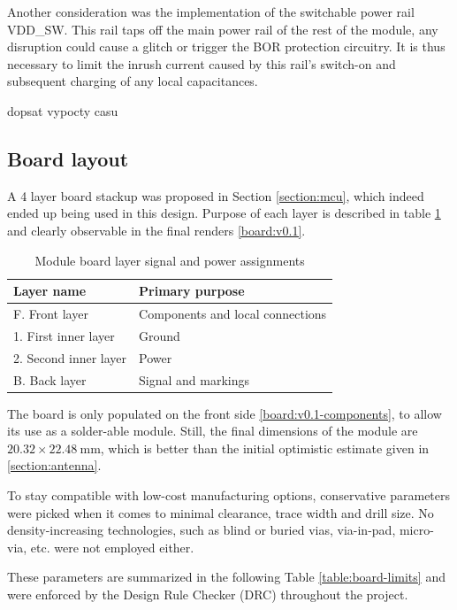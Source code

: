 Another consideration was the implementation of the switchable power rail VDD\_SW. This rail taps off the main power rail of the rest of the module, any disruption could cause a glitch or trigger the BOR protection circuitry. It is thus necessary to limit the inrush current caused by this rail's switch-on and subsequent charging of any local capacitances.

dopsat vypocty casu

\subsection{Board layout}
A 4 layer board stackup was proposed in Section \ref{section:mcu}, which indeed ended up being used in this design. Purpose of each layer is described in table \ref{table:board-layers} and clearly observable in the final renders \ref{board:v0.1}.

\begin{table}[H]
\begin{center}
\caption{\label{table:board-layers}Module board layer signal and power assignments}
    \begin{tabular}{|l|l|} \hline
    \textbf{Layer name}     & \textbf{Primary purpose} \\ \hline
    F. Front layer          & Components and local connections \\ \hline
    1. First inner layer    & Ground \\ \hline
    2. Second inner layer   & Power \\ \hline
    B. Back layer           & Signal and markings \\ \hline
    \end{tabular}
\end{center}
\end{table}

The board is only populated on the front side \ref{board:v0.1-components}, to allow its use as a solder-able module. Still, the final dimensions of the module are $20.32 \times 22.48~\mathrm{mm}$, which is better than the initial optimistic estimate given in \ref{section:antenna}.

To stay compatible with low-cost manufacturing options, conservative parameters were picked when it comes to minimal clearance, trace width and drill size. No density-increasing technologies, such as blind or buried vias, via-in-pad, micro-via, etc. were not employed either. 

These parameters are summarized in the following Table \ref{table:board-limits} and were enforced by the Design Rule Checker (DRC) throughout the project.


